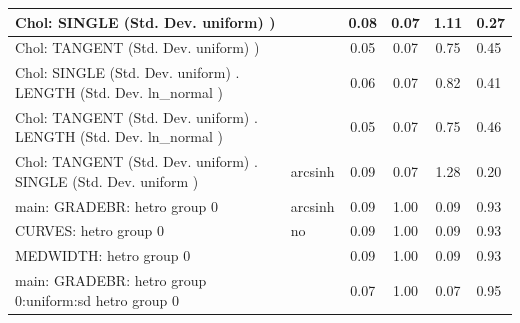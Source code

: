 \begin{table}
\begin{center}
\begin{tabular}{|l|l|c|c|c|l|}
			\hline
			 Chol: SINGLE (Std. Dev. uniform) ) &  & 0.08 & 0.07 & 1.11 & 0.27 \\
			\hline
			 Chol: TANGENT (Std. Dev. uniform) ) &  & 0.05 & 0.07 & 0.75 & 0.45 \\
			\hline
			 Chol: SINGLE (Std. Dev. uniform) . LENGTH (Std. Dev.   ln_normal ) &  & 0.06 & 0.07 & 0.82 & 0.41 \\
			\hline
			 Chol: TANGENT (Std. Dev. uniform) . LENGTH (Std. Dev.   ln_normal ) &  & 0.05 & 0.07 & 0.75 & 0.46 \\
			\hline
			 Chol: TANGENT (Std. Dev. uniform) . SINGLE (Std. Dev.   uniform ) & arcsinh & 0.09 & 0.07 & 1.28 & 0.20 \\
			\hline
			main: GRADEBR: hetro group 0 & arcsinh & 0.09 & 1.00 & 0.09 & 0.93 \\
			\hline
			CURVES: hetro group 0 & no & 0.09 & 1.00 & 0.09 & 0.93 \\
			\hline
			MEDWIDTH: hetro group 0 &  & 0.09 & 1.00 & 0.09 & 0.93 \\
			\hline
			main: GRADEBR: hetro group 0:uniform:sd  hetro group 0 &  & 0.07 & 1.00 & 0.07 & 0.95 \\
			\hline
		\end{tabular}
	\end{center}
\end{table}